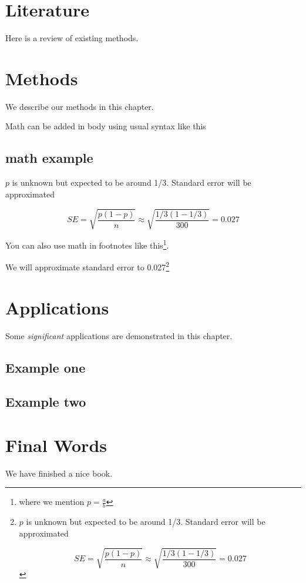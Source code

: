 \documentclass[
]{book}
\begin{document}
\chapter{Literature}\label{literature}

Here is a review of existing methods.

\chapter{Methods}\label{methods}

We describe our methods in this chapter.

Math can be added in body using usual syntax like this

\section{math example}\label{math-example}

\(p\) is unknown but expected to be around 1/3. Standard error will be approximated

\[
SE = \sqrt{\frac{p(1-p)}{n}} \approx \sqrt{\frac{1/3 (1 - 1/3)} {300}} = 0.027
\]

You can also use math in footnotes like this\footnote{where we mention \(p = \frac{a}{b}\)}.

We will approximate standard error to 0.027\footnote{\(p\) is unknown but expected to be around 1/3. Standard error will be approximated

  \[
  SE = \sqrt{\frac{p(1-p)}{n}} \approx \sqrt{\frac{1/3 (1 - 1/3)} {300}} = 0.027
  \]}

\chapter{Applications}\label{applications}

Some \emph{significant} applications are demonstrated in this chapter.

\section{Example one}\label{example-one}

\section{Example two}\label{example-two}

\chapter{Final Words}\label{final-words}

We have finished a nice book.


\end{document}

